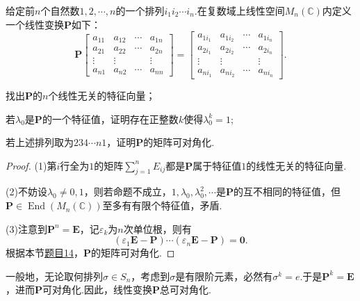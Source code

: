 \begin{prob}[31]
	给定前$n$个自然数$1,2,\cdots,n$的一个排列$i_1i_2\cdots i_n$.在复数域上线性空间$M_n(\mathbb{C})$内定义一个线性变换$\bm P$如下：
	\[
		\bm P\begin{bmatrix}
			a_{11} & a_{12} & \cdots & a_{1n} \\
			a_{21} & a_{22} & \cdots & a_{2n} \\
			\vdots & \vdots &        & \vdots \\
			a_{n1} & a_{n2} & \cdots & a_{nn}
		\end{bmatrix}=\begin{bmatrix}
			a_{1i_1} & a_{1i_2} & \cdots & a_{1i_n} \\
			a_{2i_1} & a_{2i_2} & \cdots & a_{2i_n} \\
			\vdots   & \vdots   &        & \vdots   \\
			a_{ni_1} & a_{ni_2} & \cdots & a_{ni_n}
		\end{bmatrix}.
	\]
	\begin{mylist}
		\item 找出$\bm P$的$n$个线性无关的特征向量；
		\item 若$\lambda_0$是$\bm P$的一个特征值，证明存在正整数$k$使得$\lambda_0^k=1$;
		\item 若上述排列取为$234\cdots n1$，证明$\bm P$的矩阵可对角化.
	\end{mylist}
\end{prob}
\begin{proof}
	(1)第$i$行全为$1$的矩阵$\displaystyle\sum_{j=1}^{n}E_{ij}$都是$\bm P$属于特征值$1$的线性无关的特征向量.

	(2)不妨设$\lambda_0\ne0,1$，则若命题不成立，$1,\lambda_0,\lambda_0^2,\cdots$是$\bm P$的互不相同的特征值，但$\bm P\in\operatorname*{End}(M_n(\mathbb{C}))$至多有有限个特征值，矛盾.

	(3)注意到$\bm P^n=\bm E$，记$\varepsilon_k$为$n$次单位根，则有
	\[
		(\varepsilon_1\bm E-\bm P)\cdots(\varepsilon_n\bm E-\bm P)=\bm 0.
	\]
	根据本节\hyperlink{ConditionOfDiagonalized}{题目14}，$\bm P$的矩阵可对角化.
\end{proof}
\begin{note}
	一般地，无论取何排列$\sigma\in S_n$，考虑到$\sigma$是有限阶元素，必然有$\sigma^k=e$.于是$\bm P^k=\bm E$，进而$\bm P$可对角化.因此，线性变换$\bm P$总可对角化.
\end{note}